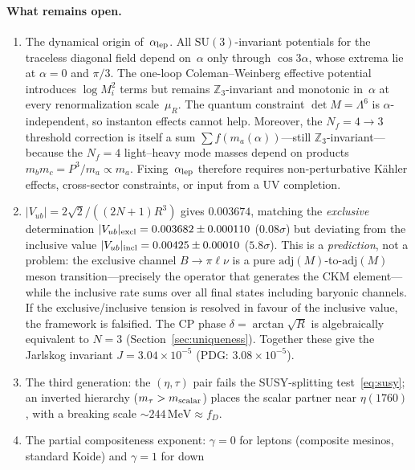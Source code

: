 \documentclass[12pt,a4paper]{article}
\newcommand{\SU}{\mathrm{SU}}
\newcommand{\Nf}{N_f}
\newcommand{\adj}{\mathrm{adj}}
\newcommand{\MeV}{\,\mathrm{MeV}}
\begin{document}
\paragraph{What remains open.}
\begin{enumerate}
  \item The dynamical origin of~$\alpha_{\rm lep}$.
    All $\SU(3)$-invariant potentials for the traceless diagonal field
    depend on~$\alpha$ only through $\cos 3\alpha$, whose extrema lie at
    $\alpha = 0$ and $\pi/3$.  The one-loop Coleman--Weinberg effective
    potential introduces $\log M_i^2$ terms but remains $\mathbb{Z}_3$-invariant
    and monotonic in~$\alpha$ at every renormalization scale~$\mu_R$.
    The quantum constraint $\det M = \Lambda^6$ is $\alpha$-independent,
    so instanton effects cannot help.  Moreover, the
    $\Nf = 4 \to 3$ threshold correction is itself a sum
    $\sum f(m_a(\alpha))$---still $\mathbb{Z}_3$-invariant---because the
    $\Nf{=}4$ light--heavy mode masses depend on products
    $m_b m_c = P^3\!/m_a \propto m_a$.  Fixing~$\alpha_{\rm lep}$
    therefore requires non-perturbative K\"ahler effects,
    cross-sector constraints, or input from a UV completion.
  \item $|V_{ub}| = 2\sqrt{2}/((2N{+}1)R^3)$ gives $0.003674$,
    matching the \emph{exclusive} determination
    $|V_{ub}|_{\rm excl} = 0.003682 \pm 0.000110$ ($0.08\sigma$) but
    deviating from the inclusive value
    $|V_{ub}|_{\rm incl} = 0.00425 \pm 0.00010$ ($5.8\sigma$).
    This is a \emph{prediction}, not a problem: the exclusive channel
    $B\to\pi\ell\nu$ is a pure $\adj(M)$-to-$\adj(M)$ meson
    transition---precisely the operator that generates the CKM
    element---while the inclusive rate sums over all final states
    including baryonic channels.  If the exclusive/inclusive tension
    is resolved in favour of the inclusive value, the framework is
    falsified. The CP phase
    $\delta = \arctan\sqrt{R}$ is algebraically equivalent to $N{=}3$
    (Section~\ref{sec:uniqueness}). Together these give the Jarlskog
    invariant $J = 3.04 \times 10^{-5}$ (PDG: $3.08 \times 10^{-5}$).
  \item The third generation: the $(\eta, \tau)$ pair fails the
    SUSY-splitting test~\eqref{eq:susy}; an inverted hierarchy
    ($m_\tau > m_{\rm scalar}$) places the scalar partner near
    $\eta(1760)$, with a breaking scale $\sim\!244\MeV \approx f_D$.
  \item The partial compositeness exponent: $\gamma = 0$ for leptons
    (composite mesinos, standard Koide) and $\gamma = 1$ for down

\end{enumerate}
\end{document}
